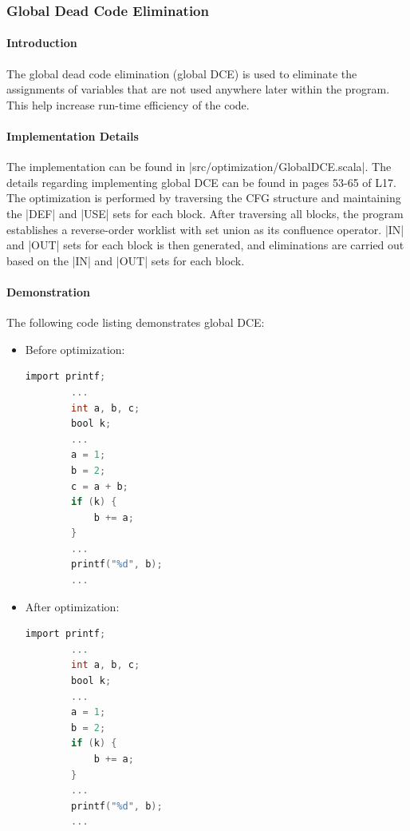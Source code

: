 \subsubsection{Global Dead Code Elimination}

\paragraph{Introduction}

The global dead code elimination (global DCE) is used to eliminate the assignments of variables that are not used anywhere later within the program. This help increase run-time efficiency of the code.

\paragraph{Implementation Details}

The implementation can be found in |src/optimization/GlobalDCE.scala|. The details regarding implementing global DCE can be found in pages 53-65 of L17. The optimization is performed by traversing the CFG structure and maintaining the |DEF| and |USE| sets for each block. After traversing all blocks, the program establishes a reverse-order worklist with set union as its confluence operator. |IN| and |OUT| sets for each block is then generated, and eliminations are carried out based on the |IN| and |OUT| sets for each block.

\paragraph{Demonstration}

The following code listing demonstrates global DCE:

\begin{itemize}
    \item Before optimization:
    \begin{lstlisting}[language=C]
        import printf;
        ...
        int a, b, c;
        bool k;
        ...
        a = 1;
        b = 2;
        c = a + b;
        if (k) {
            b += a;
        }
        ...
        printf("%d", b);
        ...
    \end{lstlisting}
    \item After optimization:
    \begin{lstlisting}[language=C]
        import printf;
        ...
        int a, b, c;
        bool k;
        ...
        a = 1;
        b = 2;
        if (k) {
            b += a;
        }
        ...
        printf("%d", b);
        ...
    \end{lstlisting}
\end{itemize}

